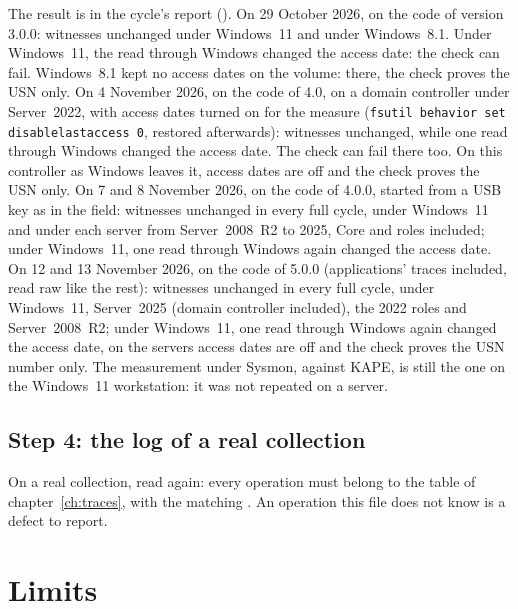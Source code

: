 \documentclass[11pt,a4paper,oneside]{report}
\begin{document}
The result is in the cycle's report (). On
29 October 2026, on the code of version 3.0.0: witnesses unchanged under
Windows~11 and under Windows~8.1. Under Windows~11, the read through Windows
changed the access date: the check can fail. Windows~8.1 kept no access dates
on the volume: there, the check proves the USN only.
On 4 November 2026, on the code of 4.0, on a domain controller under
Server~2022, with access dates turned on for the measure
(\texttt{fsutil behavior set disablelastaccess 0}, restored afterwards):
witnesses unchanged, while one read through Windows changed the access date.
The check can fail there too. On this controller as Windows leaves it, access
dates are off and the check proves the USN only.
On 7 and 8 November 2026, on the code of 4.0.0, \wac{} started from a USB key
as in the field: witnesses unchanged in every full cycle, under Windows~11 and
under each server from Server~2008~R2 to 2025, Core and roles included; under
Windows~11, one read through Windows again changed the access date.
On 12 and 13 November 2026, on the code of 5.0.0 (applications' traces
included, read raw like the rest): witnesses unchanged in every full cycle,
under Windows~11, Server~2025 (domain controller included), the 2022 roles and
Server~2008~R2; under Windows~11, one read through Windows again changed the
access date, on the servers access dates are off and the check proves the USN
number only.
The measurement under Sysmon, against KAPE, is still the one on the Windows~11
workstation: it was not repeated on a server.

\section{Step 4: the log of a real collection}

On a real collection, read  again: every operation
must belong to the table of chapter~\ref{ch:traces}, with the matching
. An operation this file does not know is a defect to
report.

\chapter{Limits}
\end{document}
